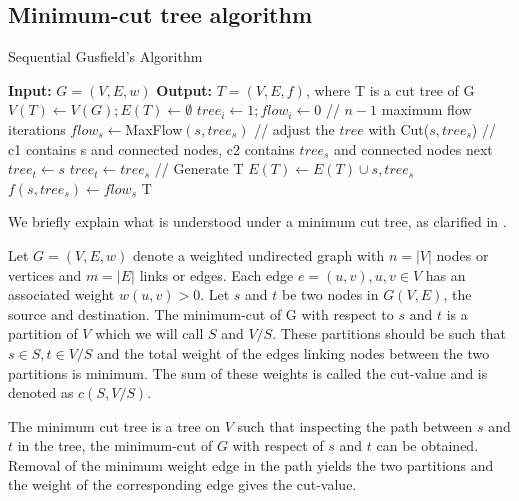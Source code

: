 \subsection{Minimum-cut tree algorithm}
\label{minimumcuttree}

\begin{algorithm}
\caption{Sequential Gusfield's Algorithm}
\label{mincutgusfield}
\begin{algorithmic}
\STATE \textbf{Input:} $G = (V,E,w)$ 
\STATE \textbf{Output:} $T = (V,E,f)$, where T is a cut tree of G
\STATE $V(T) \leftarrow V(G); E(T) \leftarrow \emptyset$
\STATE $tree_i \leftarrow 1; flow_i \leftarrow 0$
\ENDFOR
\STATE // $n - 1$ maximum flow iterations
\STATE $flow_s \leftarrow $MaxFlow$(s, tree_s)$
\STATE // adjust the $tree$ with Cut($s,tree_s$)
\STATE // c1 contains s and connected nodes, c2 contains $tree_s$ and connected nodes
			\STATE next
			\STATE $tree_t \leftarrow s$
			\STATE $tree_t \leftarrow tree_s$
		\ENDIF
	\ENDFOR
\ENDFOR
\STATE // Generate T
\STATE $E(T) \leftarrow E(T) \cup {s, tree_s}$
\STATE $f({s,tree_s}) \leftarrow flow_s$
\ENDFOR
\RETURN T
\end{algorithmic}
\end{algorithm}


We briefly explain what is understood under a minimum cut tree, as clarified in \cite{saha2006dynamic}. 

Let $G = (V,E,w)$ denote a weighted undirected graph with $n = |V|$ nodes or vertices and $m = |E|$ links or edges. Each edge $e = (u, v), u,v \in V$ has an associated weight $w(u,v) > 0$. Let $s$ and $t$ be two nodes in $G(V,E)$, the source and destination. The minimum-cut of G with respect to $s$ and $t$ is a partition of $V$ which we will call $S$ and $V/S$. These partitions should be such that $s \in S, t \in V/S$ and the total weight of the edges linking nodes between the two partitions is minimum. The sum of these weights is called the cut-value and is denoted as $c(S,V/S)$. 

The minimum cut tree is a tree on $V$ such that inspecting the path between $s$ and $t$ in the tree, the minimum-cut of $G$ with respect of $s$ and $t$ can be obtained. Removal of the minimum weight edge in the path yields the two partitions and the weight of the corresponding edge gives the cut-value.

